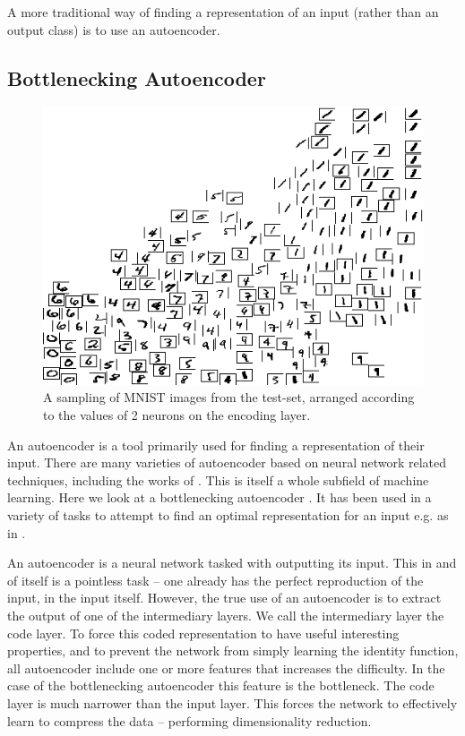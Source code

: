 \documentclass[12pt,parskip]{komatufte}\right
\begin{document}
A more traditional way of finding a representation of an input (rather than an output class) is to use an autoencoder.

\subsection{Bottlenecking Autoencoder}\label{sec:bottle-necking-autoencoder}
\begin{figure}
	\caption{A sampling of MNIST images from the test-set, arranged according to the values of 2 neurons on the encoding layer.}
	\label{mnist-encoding}
	\includegraphics[width=\textwidth]{figs/chapterintromachinelearning/mnist-encoding.png}
\end{figure}
An autoencoder is a tool primarily used for finding a representation of their input.
There are many varieties of autoencoder based on neural network related techniques, including the works of \textcite{hinton2002RBM,hinton2006reducing,hinton2006fastDBN,vincent2010stacked,ICML2012Chen_416,2014VAE}.
This is itself a whole subfield of machine learning.
Here we look at a bottlenecking autoencoder
\parencite{bourlard1988auto,japkowicz2000nonlinear}.
It has been used in a variety of tasks to attempt to find an optimal representation for an input e.g. as in .

An autoencoder is a neural network tasked with outputting its input.
This in and of itself is a pointless task -- one already has the perfect reproduction of the input, in the input itself.
However, the true use of an autoencoder is to extract the output of one of the intermediary layers.
We call the intermediary layer the code layer.
To force this coded representation to have useful interesting properties,
and to prevent the network from simply learning the identity function,
all autoencoder include one or more features that increases the difficulty.
In the case of the bottlenecking autoencoder this feature is the bottleneck.
The code layer is much narrower than the input layer.
This forces the network to effectively learn to compress the data -- performing dimensionality reduction.
\end{document}
